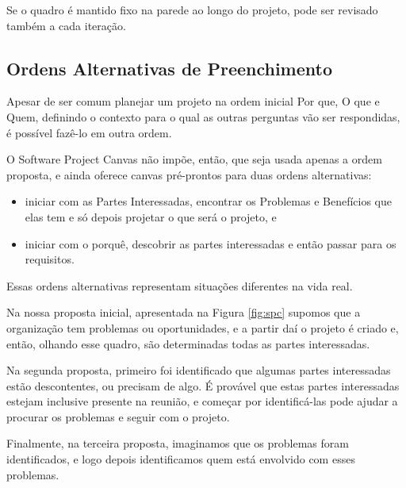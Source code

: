 \documentclass[fontsize=12pt, a4paper,pagesize=auto,toc=listof, ,twoside,chapterprefix=false,appendixprefix=true,open=right]{scrbook}
\begin{document}
Se o quadro é mantido fixo na parede ao longo do projeto, pode ser revisado também a cada iteração.

\subsection{Ordens Alternativas de Preenchimento}

Apesar de ser comum planejar um projeto na ordem inicial Por que, O que e Quem, definindo o contexto para o qual as outras perguntas vão ser respondidas, é possível fazê-lo em outra ordem.

O Software Project Canvas não impõe, então, que seja usada apenas a ordem proposta, e ainda oferece canvas pré-prontos para duas ordens alternativas:
\begin{itemize}
    \item iniciar com as Partes Interessadas, encontrar os Problemas e Benefícios que elas tem e só depois projetar o que será o projeto, e
    \item iniciar com o porquê, descobrir as partes interessadas e então passar para os requisitos.
\end{itemize}

Essas ordens alternativas representam situações diferentes na vida real.

Na nossa proposta inicial, apresentada na Figura \ref{fig:spc} supomos que a organização tem problemas ou oportunidades, e a partir daí o projeto é criado e, então, olhando esse quadro, são determinadas todas as partes interessadas.

Na segunda proposta, primeiro foi identificado que algumas partes interessadas estão descontentes, ou precisam de algo. É provável que estas partes interessadas estejam inclusive presente na reunião, e começar por identificá-las pode ajudar a procurar os problemas e seguir com o projeto.

Finalmente, na terceira proposta, imaginamos que os problemas foram identificados, e logo depois identificamos quem está envolvido com esses problemas.
\end{document}
